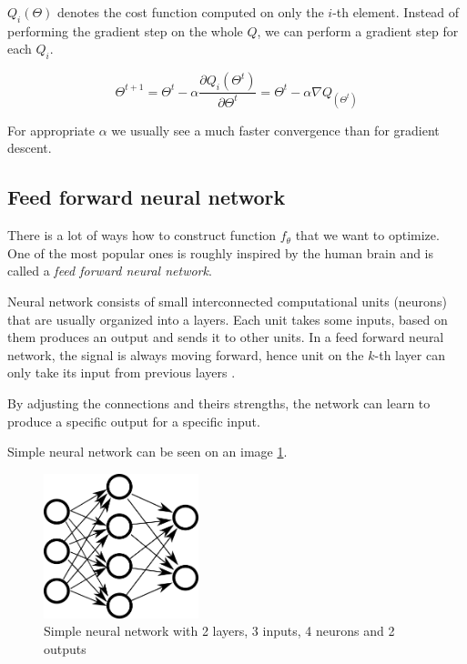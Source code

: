     $Q_i(\Theta)$ denotes the cost function computed on only the $i$-th element. 
    Instead of performing the gradient step on the whole $Q$, 
    we can perform a gradient step for each $Q_i$. 

    $$\Theta^{t+1} = \Theta^t - \alpha \frac{\partial Q_i(\Theta^t)}{\partial \Theta^t} = \Theta^t - \alpha \nabla Q_(\Theta^t)$$
    
    For appropriate $\alpha$ we usually see a much faster convergence than for gradient descent.
    
    \subsection{Feed forward neural network}
    There is a lot of ways how to construct function $f_\theta$ that we want to optimize. 
    One of the most popular ones is roughly inspired by the human brain and is called a \textit{feed forward neural network}. \* %
    
    Neural network consists of small interconnected computational units (neurons) that are usually organized into a layers.
    Each unit takes some inputs, based on them produces an output and sends it to other units. 
    In a feed forward neural network, the signal is always moving forward,
    hence unit on the $k$-th layer can only take its input from previous layers \cite{Goodfellow-et-al-2016}.
    
    By adjusting the connections and theirs strengths, the network can learn to produce a specific output for a specific input.
    
    Simple neural network can be seen on an image \ref{obr:siet}.
    
    \begin{figure}[h]
    \centerline{\includegraphics[width=0.4\textwidth]{images/neural_network}}
    \caption[Simple neural network with 2 layers, 3 inputs, 4 neurons and 2 outputs]{Simple neural network with 2 layers, 3 inputs, 4 neurons and 2 outputs}
    \label{obr:siet}
    \end{figure}
    
